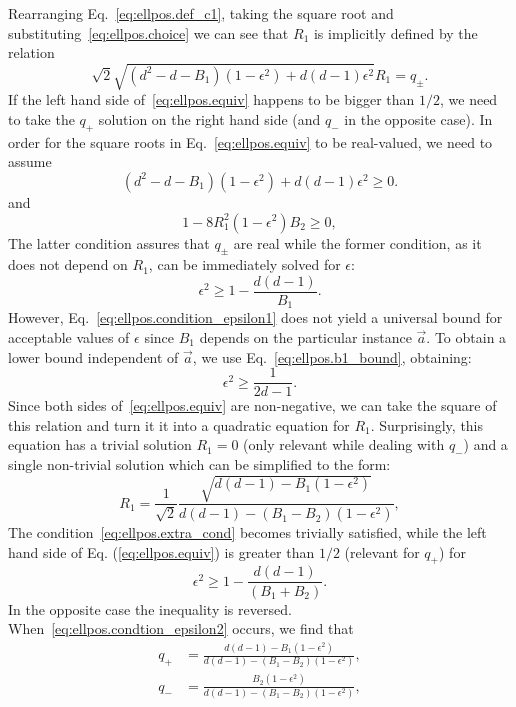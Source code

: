 Rearranging Eq.~\eqref{eq:ellpos.def_c1}, taking the square root and substituting~\eqref{eq:ellpos.choice} we can see that $R_1$ is implicitly defined by the relation
\[
  \sqrt{2}\sqrt{\left(d^{2}-d-B_1\right)\left(1-\epsilon^{2}\right)+d\left(d-1\right)\epsilon^{2}}R_{1}=q_\pm.
  \label{eq:ellpos.equiv}
\]
If the left hand side of~\eqref{eq:ellpos.equiv} happens to be bigger than $1/2$, we need to take the $q_+$ solution on the right hand side (and $q_-$ in the opposite case). In order for the square roots in Eq.~\eqref{eq:ellpos.equiv} to be real-valued, we need to assume
\[
  \left(d^{2}-d-B_1\right)\left(1-\epsilon^{2}\right)+d\left(d-1\right)\epsilon^{2}\geq0.
\]
and
\[
  1-8R_{1}^{2}\left(1-\epsilon^{2}\right)B_{2}\geq0,\label{eq:ellpos.extra_cond}
\]
The latter condition assures that $q_\pm$ are real while the former condition, as it
does not depend on $R_{1}$, can be immediately solved for $\epsilon$:
\[
  \epsilon^{2}\geq1-\frac{d\left(d-1\right)}{B_{1}}.
  \label{eq:ellpos.condition_epsilon1}
\]
However, Eq.~\eqref{eq:ellpos.condition_epsilon1} does not yield a universal bound for acceptable values of $\epsilon$ since $B_1$ depends on the particular instance $\vec a$.
To obtain a lower bound independent of $\vec a$, we use Eq.~\eqref{eq:ellpos.b1_bound}, obtaining:
\[
\epsilon^2 \geq \frac{1}{2d - 1}.
\]
Since both sides of~\eqref{eq:ellpos.equiv} are non-negative, we can take the square of this relation and turn it it into a quadratic equation for $R_1$. Surprisingly, this equation has a trivial solution $R_1=0$ (only relevant while dealing with $q_-$) and a single  non-trivial solution which can be simplified to the form:
\[
  R_{1}=\frac{1}{\sqrt{2}}\frac{\sqrt{d\left(d-1\right)-B_{1}\left(1-\epsilon^{2}\right)}}{d\left(d-1\right)-\left(B_{1}-B_{2}\right)\left(1-\epsilon^{2}\right)},
  \label{eq:ellpos_r1}
\]
The condition~\eqref{eq:ellpos.extra_cond} becomes trivially satisfied, while the left hand side of Eq. (\ref{eq:ellpos.equiv}) is greater than $1/2$ (relevant for $q_+$) for
\[
  \epsilon^{2}\geq1-\frac{d\left(d-1\right)}{\left(B_{1}+B_{2}\right)}.
  \label{eq:ellpos.condtion_epsilon2}
\]
In the opposite case the inequality is reversed.
When~\eqref{eq:ellpos.condtion_epsilon2} occurs, we find that
\begin{align}
  q_{+} &= \frac{d\left(d-1\right)-B_{1}\left(1-\epsilon^{2}\right)}{d\left(d-1\right)-\left(B_{1}-B_{2}\right)\left(1-\epsilon^{2}\right)}\label{qp},\\
  q_{-} &=\frac{B_{2}\left(1-\epsilon^{2}\right)}{d\left(d-1\right)-\left(B_{1}-B_{2}\right)\left(1-\epsilon^{2}\right)},
\end{align}
